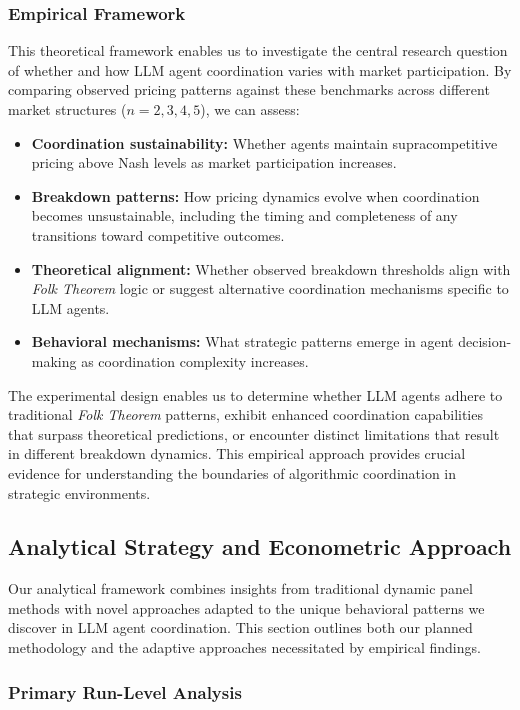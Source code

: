 \subsubsection*{Empirical Framework}

This theoretical framework enables us to investigate the central research question of whether and how LLM agent coordination varies with market participation. By comparing observed pricing patterns against these benchmarks across different market structures ($n = 2, 3, 4, 5$), we can assess:
\begin{itemize}[noitemsep]
    \item \textbf{Coordination sustainability:} Whether agents maintain supracompetitive pricing above Nash levels as market participation increases.
    \item \textbf{Breakdown patterns:} How pricing dynamics evolve when coordination becomes unsustainable, including the timing and completeness of any transitions toward competitive outcomes.
    \item \textbf{Theoretical alignment:} Whether observed breakdown thresholds align with \emph{Folk Theorem} logic or suggest alternative coordination mechanisms specific to LLM agents.
    \item \textbf{Behavioral mechanisms:} What strategic patterns emerge in agent decision-making as coordination complexity increases.
\end{itemize}

The experimental design enables us to determine whether LLM agents adhere to traditional \emph{Folk Theorem} patterns, exhibit enhanced coordination capabilities that surpass theoretical predictions, or encounter distinct limitations that result in different breakdown dynamics. This empirical approach provides crucial evidence for understanding the boundaries of algorithmic coordination in strategic environments.

\subsection{Analytical Strategy and Econometric Approach}

Our analytical framework combines insights from traditional dynamic panel methods with novel approaches adapted to the unique behavioral patterns we discover in LLM agent coordination. This section outlines both our planned methodology and the adaptive approaches necessitated by empirical findings.

\subsubsection*{Primary Run-Level Analysis}


